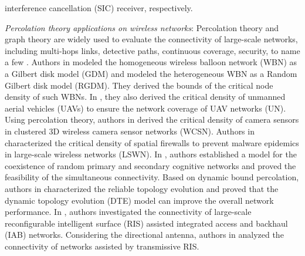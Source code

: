 \documentclass[final]{IEEEtran}
\begin{document}
interference cancellation (SIC) receiver, respectively.

\indent \textit{Percolation theory applications on wireless networks}: Percolation theory and graph theory are widely used to evaluate the connectivity of large-scale networks, including multi-hops links, detective paths, continuous coverage, security, to name a few \cite{haenggi2009stochastic,haenggi2012stochastic,elsawy2023tutorial}. Authors in \cite{anjum2019percolation} modeled the homogeneous wireless balloon network (WBN) as a Gilbert disk model (GDM) and modeled the heterogeneous WBN as a Random Gilbert disk model (RGDM).
They derived the bounds of the critical node density of such WBNs. In \cite{anjum2020coverage}, they also derived the critical density of unmanned aerial vehicles (UAVs) to ensure the network coverage of UAV networks (UN). Using percolation theory, authors in \cite{wang2019cooperative} derived the critical density of camera sensors in clustered 3D wireless camera sensor networks (WCSN). Authors in \cite{zhaikhan2020safeguarding} characterized the critical density of spatial firewalls to prevent malware epidemics in large-scale wireless networks (LSWN). In \cite{yemini2019simultaneous}, authors established a model for the coexistence of random primary and secondary cognitive networks and proved the feasibility of the simultaneous connectivity. Based on dynamic bound percolation, authors in \cite{han2024dynamic} characterized the reliable topology evolution and proved that the dynamic topology evolution (DTE) model can improve the overall network performance.
In \cite{wu2023connectivity}, authors investigated the connectivity of large-scale reconfigurable intelligent surface (RIS) assisted integrated access and backhaul (IAB) networks.
Considering the directional antenna, authors in \cite{zhu2023connectivity} analyzed the connectivity of networks assisted by transmissive RIS.
\end{document}
